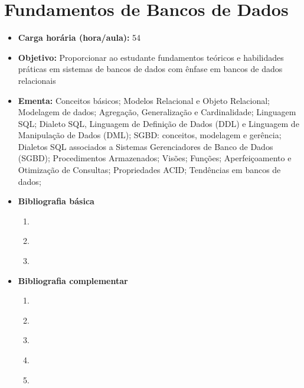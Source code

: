 \documentclass[
	10pt,				%
	openright,			%
	twoside,			%
	a4paper,			%
	english,			%
	french,				%
	brazil,				%
	sumario=tradicional
]{abntex2}
\begin{document}
\section*{Fundamentos de Bancos de Dados}\label{2_bancodados}

\begin{itemize}
	\item \textbf{Carga horária (hora/aula):} 54
	\item \textbf{Objetivo:} Proporcionar ao estudante fundamentos teóricos e habilidades práticas em sistemas de bancos de dados com ênfase em bancos de dados relacionais
	\item \textbf{Ementa:} 
	Conceitos básicos;
	Modelos Relacional e Objeto Relacional;
	Modelagem de dados; 
	Agregação, Generalização e Cardinalidade; 
	Linguagem SQL; 
	Dialeto SQL, Linguagem de Definição de Dados (DDL) e Linguagem de Manipulação de Dados (DML);
	SGBD: conceitos, modelagem e gerência;
	Dialetos SQL associados a Sistemas Gerenciadores de Banco de Dados (SGBD);
	Procedimentos Armazenados; 
	Visões; 
	Funções; 
	Aperfeiçoamento e Otimização de Consultas;
	Propriedades ACID;
	Tendências em bancos de dados;
	\item \textbf{Bibliografia básica}
	\begin{enumerate}
		\item \cite{silberschatz2016}
		\item \cite{elmasrinavathe2011}
		\item \cite{date2004}
	\end{enumerate}
	\item \textbf{Bibliografia complementar}
	\begin{enumerate}
		\item \cite{milani2008}
		\item \cite{machado2014}
		\item \cite{angelotti2010}
		\item \cite{cougo1997}
		\item \cite{toby2007}
	\end{enumerate}	
\end{itemize}


\newpage
\end{document}
